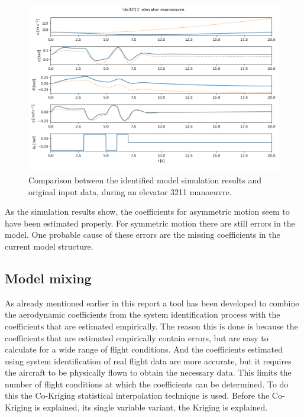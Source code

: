 \begin{figure}
    \centering
    \includegraphics[width=14cm]{figures/pest_de3211.png}
    \caption{Comparison between the identified model simulation results and original input data, during an elevator 3211 manoeuvre.}
    \label{fig:pest_de3211}
\end{figure}

As the simulation results show, the coefficients for asymmetric motion seem to have been estimated properly. For symmetric motion there are still errors in the model. One probable cause of these errors are the missing coefficients in the current model structure. 



\subsection{Model mixing}
As already mentioned earlier in this report a tool has been developed to combine the aerodynamic coefficients from the system identification process with the coefficients that are estimated empirically. The reason this is done is because the coefficients that are estimated empirically contain errors, but are easy to calculate for a wide range of flight conditions. And the coefficients estimated using system identification of real flight data are more accurate, but it requires the aircraft to be physically flown to obtain the necessary data. This limits the number of flight conditions at which the coefficients can be determined. To do this the Co-Kriging statistical interpolation technique is used. Before the Co-Kriging is explained, its single variable variant, the Kriging is explained. \\

